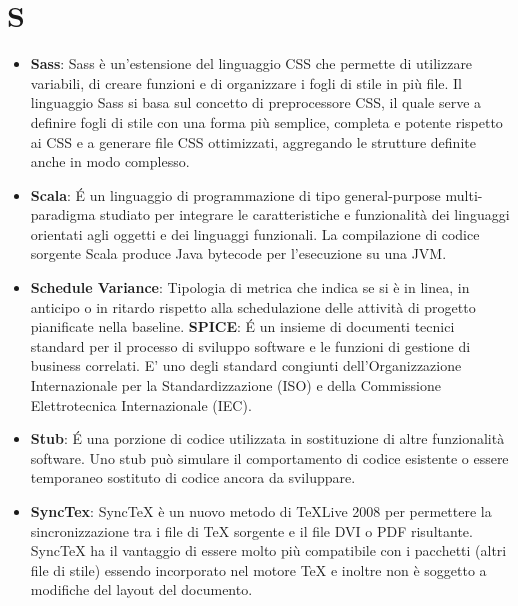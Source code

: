 \section{S}
\begin{itemize} 
	\item
	\textbf{Sass}: Sass è un'estensione del linguaggio CSS che permette di utilizzare variabili, di creare funzioni e di organizzare i fogli di stile in più file. Il linguaggio Sass si basa sul concetto di preprocessore CSS, il quale serve a definire fogli di stile con una forma più semplice, completa e potente rispetto ai CSS e a generare file CSS ottimizzati, aggregando le strutture definite anche in modo complesso.
	\item
	\textbf{Scala}: É un linguaggio di programmazione di tipo general-purpose multi-paradigma studiato per integrare le caratteristiche e funzionalità dei linguaggi orientati agli oggetti e dei linguaggi funzionali. La compilazione di codice sorgente Scala produce Java bytecode per l'esecuzione su una JVM.
	\item
	\textbf{Schedule Variance}: Tipologia di metrica che indica se si è in linea, in anticipo o in ritardo rispetto alla schedulazione delle attività di progetto pianificate nella baseline. 
	\textbf{SPICE}: É un insieme di documenti tecnici standard per il processo di sviluppo software e le funzioni di gestione di business correlati. E' uno degli standard congiunti dell'Organizzazione Internazionale per la Standardizzazione (ISO) e della Commissione Elettrotecnica Internazionale (IEC).
	\item
	\textbf{Stub}: É una porzione di codice utilizzata in sostituzione di altre funzionalità software. Uno stub può simulare il comportamento di codice esistente o essere temporaneo sostituto di codice ancora da sviluppare. 
	\item
	\textbf{SyncTex}: SyncTeX è un nuovo metodo di TeXLive 2008 per permettere la sincronizzazione tra i file di TeX sorgente e il file DVI o PDF risultante. SyncTeX ha il vantaggio di essere molto più compatibile con i pacchetti (altri file di stile) essendo incorporato nel motore TeX e inoltre non è soggetto a modifiche del layout del documento.
\end{itemize}